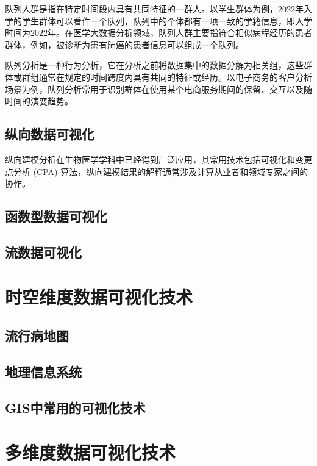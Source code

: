 \documentclass[lang=cn,color=black,10pt,founder,newtx]{elegantbook}
\begin{document}
队列人群是指在特定时间段内具有共同特征的一群人。以学生群体为例，2022年入学的学生群体可以看作一个队列，队列中的个体都有一项一致的学籍信息，即入学时间为2022年。在医学大数据分析领域，队列人群主要指符合相似病程经历的患者群体，例如，被诊断为患有肺癌的患者信息可以组成一个队列。

 队列分析是一种行为分析，它在分析之前将数据集中的数据分解为相关组，这些群体或群组通常在规定的时间跨度内具有共同的特征或经历。以电子商务的客户分析场景为例，队列分析常用于识别群体在使用某个电商服务期间的保留、交互以及随时间的演变趋势。
 
\subsection{纵向数据可视化}






纵向建模分析在生物医学学科中已经得到广泛应用，其常用技术包括可视化和变更点分析 (CPA) 算法，纵向建模结果的解释通常涉及计算从业者和领域专家之间的协作。 


\subsection{函数型数据可视化}


\subsection{流数据可视化}
\section{时空维度数据可视化技术}
\subsection{流行病地图}
\subsection{地理信息系统}
\subsection{GIS中常用的可视化技术}

\section{多维度数据可视化技术}
\end{document}
